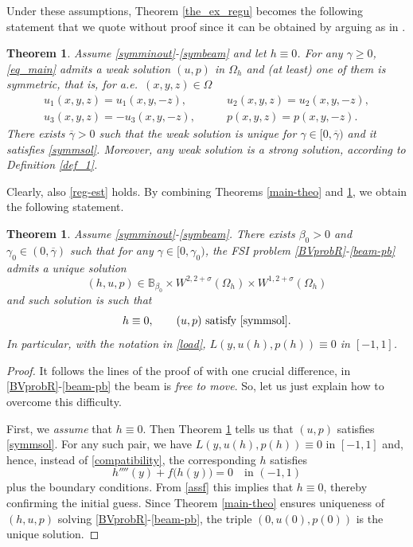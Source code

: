 \documentclass[11pt,a4paper]{amsart}
\newtheorem{theorem}[proposition]{Theorem}
\theoremstyle{remark}
\theoremstyle{definition}
\numberwithin{equation}{section}
\numberwithin{proposition}{section}
\begin{document}
Under these assumptions, Theorem \ref{the_ex_regu} becomes the following statement that we quote without proof since it can be obtained by
arguing as in \cite{clara,GS}.

\begin{theorem}\label{symmNS} Assume \eqref{symminout}-\eqref{symbeam} and let $h\equiv0$. For any $\gamma\geq0$, \eqref{eq_main} admits a weak solution $(u, p)$ in $\Omega_h$ and (at least)
one of them is symmetric, that is, for a.e.\ $(x,y,z)\in\Omega$
\begin{equation}\label{symmsol}
\begin{array}{ll}
u_1(x,y,z)=u_1(x,y,-z),\qquad & u_2(x,y,z)=u_2(x,y,-z),\\
u_3(x,y,z)=-u_3(x,y,-z),\qquad & p(x,y,z)=p(x,y,-z).
\end{array}
\end{equation}
There exists $\overline{\gamma}>0$ such that the weak solution is unique for $\gamma\in [0, \overline{\gamma})$ and it satisfies \eqref{symmsol}. Moreover,
any weak solution is a strong solution, according to Definition \ref{def_1}.
\end{theorem}

Clearly, also \eqref{reg-est} holds. By combining Theorems \ref{main-theo} and \ref{symmNS}, we obtain the following statement.

\begin{theorem}\label{main-theo-symm}
Assume \eqref{symminout}-\eqref{symbeam}. There exists $\beta_0>0$ and $\gamma_0\in (0, \overline{\gamma})$ such that for any $\gamma \in [0,\gamma_0)$, the FSI problem \eqref{BVprobR}-\eqref{beam-pb} admits a unique solution $$(h, u, p)\in\mathbb{B}_{\beta_0}\times W^{2, 2+\sigma}(\Omega_h)\times W^{1, 2+\sigma}(\Omega_h)$$
and such solution is such that
$$h\equiv0,\qquad (u,p)\mbox{ satisfy \eqref{symmsol}}.$$
In particular, with the notation in \eqref{load}, $L(y, u(h), p(h))\equiv0$ in $[-1,1]$.
\end{theorem}
\begin{proof} It follows the lines of the proof of \cite[Theorem 2.1]{clara} with one crucial difference, in \eqref{BVprobR}-\eqref{beam-pb} the beam is {\em free to move}.
So, let us just explain how to overcome this difficulty.\par
First, we {\em assume} that $h\equiv0$. Then Theorem \ref{symmNS} tells us that $(u,p)$ satisfies \eqref{symmsol}. For any such pair, we have $L(y, u(h), p(h))\equiv0$ in $[-1,1]$ and, hence,
instead of \eqref{compatibility}, the corresponding $h$ satisfies
$$
h''''(y)+f\big(h(y)\big)=0\quad\mbox{in }(-1,1)
$$
plus the boundary conditions. From \eqref{assf} this implies that $h\equiv0$, thereby confirming the initial guess. Since Theorem \ref{main-theo} ensures uniqueness of
$(h, u, p)$ solving \eqref{BVprobR}-\eqref{beam-pb}, the triple $(0,u(0),p(0))$ is the unique solution.\end{proof}
\end{document}
